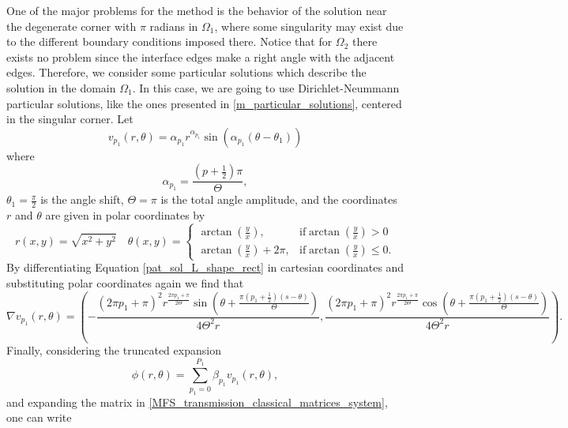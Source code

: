 One of the major problems for the method is the behavior of the solution near the degenerate corner with \(\pi\) radians in \(\Omega_1\), where some singularity may exist due to the different boundary conditions imposed there. Notice that for \(\Omega_2\) there exists no problem since the interface edges make a right angle with the adjacent edges. Therefore, we consider some particular solutions which describe the solution in the domain \(\Omega_1\). In this case, we are going to use Dirichlet-Neummann particular solutions, like the ones presented in \ref{m_particular_solutions}, centered in the singular corner. Let
\begin{equation}\label{pat_sol_L_shape_rect}
    v_{p_1}(r, \theta) = \alpha_{p_1} r^{\alpha_{p_1}} \sin(\alpha_{p_1}(\theta - \theta_1))
\end{equation}
where
\[
    \alpha_{p_1} = \frac{(p+\frac{1}{2})\pi}{\Theta},
\]
\(\theta_1 = \frac{\pi}{2}\) is the angle shift, \(\Theta = \pi\) is the total angle amplitude,  and the coordinates \(r\) and \(\theta\) are given in polar coordinates by
\[
    r(x,y) = \sqrt{x^2+y^2} \quad \theta(x,y)=\begin{cases}
        \arctan(\frac{y}{x}),& \text{if} \arctan(\frac{y}{x})>0\\
        \arctan(\frac{y}{x})+2\pi,& \text{if} \arctan(\frac{y}{x})\leq0.
    \end{cases}
\]
By differentiating Equation \eqref{pat_sol_L_shape_rect} in cartesian coordinates and substituting polar coordinates again we find that
\begin{equation*}
    \nabla v_{p_1}(r, \theta) = \left(-\frac{(2 \pi  {p_1}+\pi )^2 r^{\frac{2 \pi  {p_1}+\pi }{2 \Theta }} \sin \left(\theta +\frac{\pi  \left(p_1+\frac{1}{2}\right) (s-\theta )}{\Theta }\right)}{4 \Theta ^2 r},\frac{(2 \pi  p_1+\pi )^2 r^{\frac{2 \pi  p_1+\pi }{2 \Theta }} \cos \left(\theta +\frac{\pi  \left(p_1+\frac{1}{2}\right) (s-\theta )}{\Theta }\right)}{4 \Theta ^2 r}\right).
\end{equation*}
Finally, considering the truncated expansion
\begin{equation}\label{num_particular_L_shape_rect_equation}
    \phi(r,\theta)=\sum_{p_1=0}^{P_1} \beta_{p_1} v_{p_1}(r, \theta),
\end{equation}
and expanding the matrix in \eqref{MFS_transmission_classical_matrices_system}, one can write
